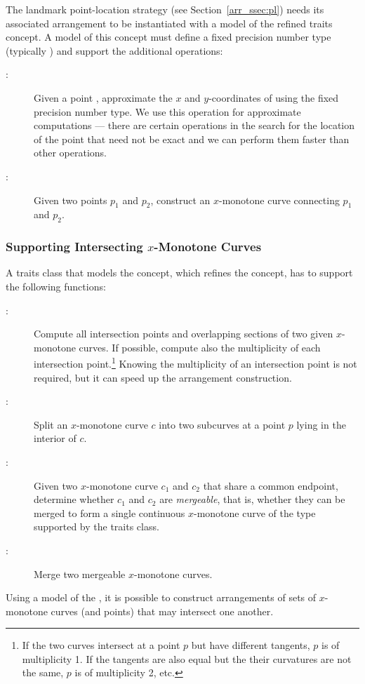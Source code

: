 The landmark point-location strategy (see
Section~\ref{arr_ssec:pl}) needs its associated arrangement to be
instantiated with a model of the refined
 traits concept. A model of this
concept must define a fixed precision number type (typically
) and support the additional operations:
\begin{description}
\item[:]
  Given a point , approximate the $x$ and $y$-coordinates
  of  using the fixed precision number type. We use this operation
  for approximate computations --- there are certain operations in the
  search for the location of the point that need not be exact and we can
  perform them faster than other operations.
%
\item[:] Given two points $p_1$ and
  $p_2$, construct an $x$-monotone curve connecting $p_1$ and $p_2$.
\end{description}

\subsubsection{Supporting Intersecting $x$-Monotone Curves
\label{arr_sssec:tr_xmon_concept}}

A traits class that models the 
concept, which refines the 
concept, has to support the following functions:
\begin{description}
\item[:]
  Compute all intersection points and overlapping sections of
  two given $x$-monotone curves. If possible, compute also the
  multiplicity of each intersection point.\footnote{If the two
    curves intersect at a point $p$ but have different tangents, $p$
    is of multiplicity 1. If the tangents are also equal but the their
    curvatures are not the same, $p$ is of multiplicity 2, etc.}
  Knowing the multiplicity of an intersection point is not required,
  but it can speed up the arrangement construction.
%
\item[:] Split an $x$-monotone curve $c$ into two subcurves
  at a point $p$ lying in the interior of $c$.
%
\item[:] Given two $x$-monotone curve $c_1$ and
  $c_2$ that share a common endpoint, determine whether $c_1$ and $c_2$
  are \emph{mergeable}, that is, whether they can be merged to form a
  single continuous $x$-monotone curve of the type supported by the
  traits class.
%
\item[:] Merge two mergeable $x$-monotone curves.
\end{description}
Using a model of the , it is
possible to construct arrangements of sets of $x$-monotone curves
(and points) that may intersect one another.

